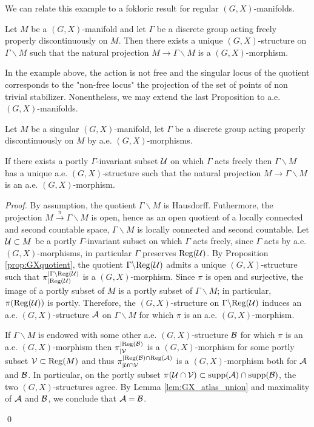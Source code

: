 We can relate this example to a fokloric result for regular $(G,X)$-manifolds.
\begin{prop}\label{prop:GXquotient} Let $M$ be a $(G,X)$-manifold and let $\Gamma$ be a discrete group acting freely properly discontinuously on $M$. Then there exists a unique $(G,X)$-structure on $\Gamma\backslash M$  such that the natural projection $M\rightarrow \Gamma\backslash M$ is a $(G,X)$-morphism.
\end{prop}
In the example above, the action is not free and the singular locus of the quotient corresponds to the "non-free locus" the projection of the set of points of non trivial stabilizer. Nonentheless, we may extend the last Proposition to a.e. $(G,X)$-manifolds.
\begin{prop}\label{prop:aeGXquotient}
 Let $M$ be a singular $(G,X)$-manifold, let $\Gamma$ be a discrete group acting properly discontinuously on $M$ by a.e. $(G,X)$-morphisms. 
 
 If there exists a portly $\Gamma$-invariant subset $\mathcal{U}$ on which $\Gamma$ acts freely then $\Gamma\backslash M$ has a unique a.e. $(G,X)$-structure such that the natural projection $M \rightarrow \Gamma\backslash M$ is an a.e. $(G,X)$-morphism.
\end{prop}
\begin{proof}
 By assumption, the quotient $\Gamma \backslash M$ is Hausdorff. Futhermore,
 the projection $M \xrightarrow{\pi} \Gamma \backslash M$  is open, hence as an open quotient of a locally connected and second countable space, $\Gamma\backslash M$ is locally connected and second countable. 
 Let $\mathcal{U} \subset M$ be a portly $\Gamma$-invariant subset on which $\Gamma$ acts freely, since $\Gamma$ acts by a.e. $(G,X)$-morphisms, in particular $\Gamma$ preserves $\mathrm{Reg}(\mathcal{U})$. By Proposition \ref{prop:GXquotient}, the quotient $\Gamma \backslash \mathrm{Reg}(\mathcal{U})$ admits a unique $(G,X)$-structure such that  
 $\pi_{|\mathrm{Reg}(\mathcal{U})}^{|\Gamma \backslash \mathrm{Reg}(\mathcal{U})}$ is a $(G,X)$-morphism.
 Since $\pi$ is open and surjective, the image of a portly subset of $M$ is a portly subset of $\Gamma\backslash M$; in particular, $\pi(\mathrm{Reg}(\mathcal{U}))$ is portly. Therefore, the $(G,X)$-structure  on $\Gamma\backslash \mathrm{Reg}(\mathcal{U})$ induces an a.e. $(G,X)$-structure $\mathcal A$ on $\Gamma\backslash M$ for which $\pi$ is an a.e. $(G,X)$-morphism.
 
 If $\Gamma\backslash M$ is endowed with some other a.e. $(G,X)$-structure $\mathcal B$ for which $\pi$ is an a.e. $(G,X)$-morphism then $\pi_{|\mathcal V}^{|\mathrm{Reg}(\mathcal B)}$ is a $(G,X)$-morphism for some portly subset $\mathcal V\subset \mathrm{Reg}(M)$ and thus $\pi_{|\mathcal{U}\cap\mathcal V}^{|\mathrm{Reg}(\mathcal B)\cap \mathrm{Reg}(\mathcal A)}$ is a $(G,X)$-morphism both for $\mathcal A$ and $\mathcal B$. In particular, on the portly subset $\pi(\mathcal{U}\cap \mathcal V)\subset \mathrm{supp}(\mathcal A)\cap \mathrm{supp}(\mathcal B)$, the two $(G,X)$-structures agree. By Lemma \ref{lem:GX_atlas_union} and maximality of $\mathcal A$ and $\mathcal B$, we conclude that $\mathcal A=\mathcal B$.
 
\qed\end{proof}



